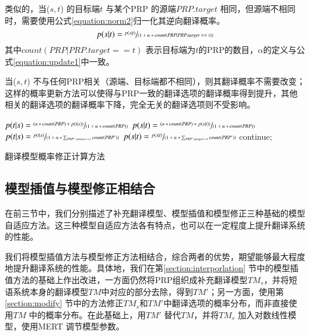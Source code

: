 \documentclass[master, winfont]{njuthesis}
\begin{document}
类似的，当($s,t$) 的目标端$t$ 与某个PRP 的源端$PRP.target$ 相同，但源端不相同时，需要使用公式\ref{equation:norm2}归一化其逆向翻译概率。
\begin{equation}
  \label{equation:norm2}
    p(s|t) = \sfrac{p(s|t)}{(1 + \alpha*count(PRP|PRP.target == t))}
\end{equation}
其中$count(PRP|PRP.target == t)$ 表示目标端为$t$的PRP的数目，$\alpha$的定义与公式\ref{equation:update1}中一致。

当($s,t$) 不与任何PRP相关（源端、目标端都不相同），则其翻译概率不需要改变；这样的概率更新方法可以使得与PRP一致的翻译选项的翻译概率得到提升，其他相关的翻译选项的翻译概率下降，完全无关的翻译选项则不受影响。

\begin{algorithm}
\begin{algorithmic}[1]
        \STATE $p(t|s) = \sfrac{(\alpha * count(PRP) + p(t|s))}{(1 + \alpha*count(PRP))}$
        \STATE $p(s|t) = \sfrac{(\alpha*count(PRP) + p(s|t))}{(1 + \alpha*count(PRP))}$
        \STATE $p(t|s) = \sfrac{p(t|s)}{(1 + \alpha*\sum_{PRP'.source == s}count(PRP'))}$
        \STATE $p(s|t) = \sfrac{p(s|t)}{(1 + \alpha*\sum_{PRP'.target == t}count(PRP'))}$
    \ELSE
        \STATE continue;
    \ENDIF
\ENDFOR
\end{algorithmic}
\caption{\label{algorithm:modifymodel}翻译模型概率修正计算方法}
\end{algorithm}

\subsection{模型插值与模型修正相结合}
\label{section:combination}
在前三节中，我们分别描述了补充翻译模型、模型插值和模型修正三种基础的模型自适应方法。这三种模型自适应方法各有特点，也可以在一定程度上提升翻译系统的性能。

%
我们将模型插值方法与模型修正方法相结合，综合两者的优势，期望能够最大程度地提升翻译系统的性能。具体地，我们在第\ref{section:interporlation} 节中的模型插值方法的基础上作出改进，一方面仍然将PRP组织成补充翻译模型$TM_s$，并将短语系统本身的翻译模型$TM$中对应的部分去除，得到$TM'$；另一方面，使用第\ref{section:modify} 节中的方法修正$TM_s$和$TM'$中翻译选项的概率分布，而非直接使用$TM$ 中的概率分布。在此基础上，用$TM'$ 替代$TM$，并将$TM_s$ 加入对数线性模型，使用MERT 调节模型参数。
\end{document}
